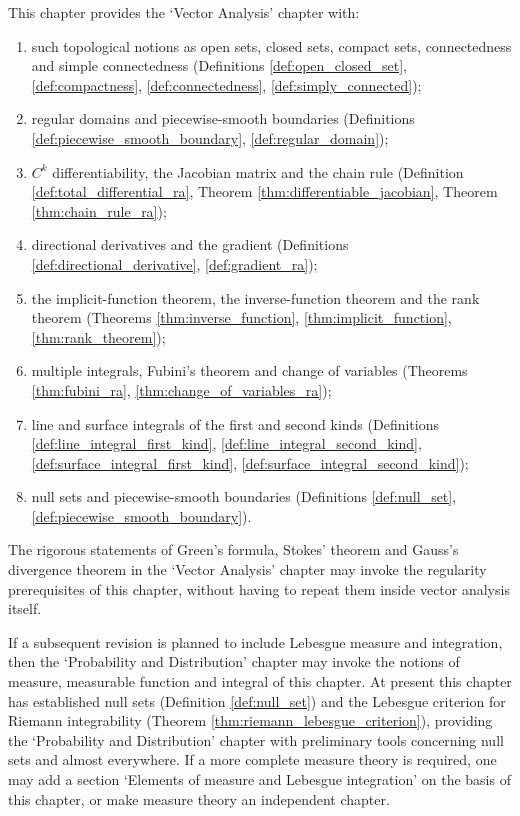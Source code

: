 \begin{remark}\label{rem:ra_to_vector_analysis}
This chapter provides the `Vector Analysis' chapter with:
\begin{enumerate}[label=(\roman*)]
    \item such topological notions as open sets, closed sets, compact sets, connectedness and simple connectedness (Definitions \ref{def:open_closed_set}, \ref{def:compactness}, \ref{def:connectedness}, \ref{def:simply_connected});
    \item regular domains and piecewise-smooth boundaries (Definitions \ref{def:piecewise_smooth_boundary}, \ref{def:regular_domain});
    \item $C^k$ differentiability, the Jacobian matrix and the chain rule (Definition \ref{def:total_differential_ra}, Theorem \ref{thm:differentiable_jacobian}, Theorem \ref{thm:chain_rule_ra});
    \item directional derivatives and the gradient (Definitions \ref{def:directional_derivative}, \ref{def:gradient_ra});
    \item the implicit-function theorem, the inverse-function theorem and the rank theorem (Theorems \ref{thm:inverse_function}, \ref{thm:implicit_function}, \ref{thm:rank_theorem});
    \item multiple integrals, Fubini's theorem and change of variables (Theorems \ref{thm:fubini_ra}, \ref{thm:change_of_variables_ra});
    \item line and surface integrals of the first and second kinds (Definitions \ref{def:line_integral_first_kind}, \ref{def:line_integral_second_kind}, \ref{def:surface_integral_first_kind}, \ref{def:surface_integral_second_kind});
    \item null sets and piecewise-smooth boundaries (Definitions \ref{def:null_set}, \ref{def:piecewise_smooth_boundary}).
\end{enumerate}
The rigorous statements of Green's formula, Stokes' theorem and Gauss's divergence theorem in the `Vector Analysis' chapter may invoke the regularity prerequisites of this chapter, without having to repeat them inside vector analysis itself.
\end{remark}

\begin{remark}\label{rem:ra_to_probability}
If a subsequent revision is planned to include Lebesgue measure and integration, then the `Probability and Distribution' chapter may invoke the notions of measure, measurable function and integral of this chapter. At present this chapter has established null sets (Definition \ref{def:null_set}) and the Lebesgue criterion for Riemann integrability (Theorem \ref{thm:riemann_lebesgue_criterion}), providing the `Probability and Distribution' chapter with preliminary tools concerning null sets and almost everywhere. If a more complete measure theory is required, one may add a section `Elements of measure and Lebesgue integration' on the basis of this chapter, or make measure theory an independent chapter.
\end{remark}

